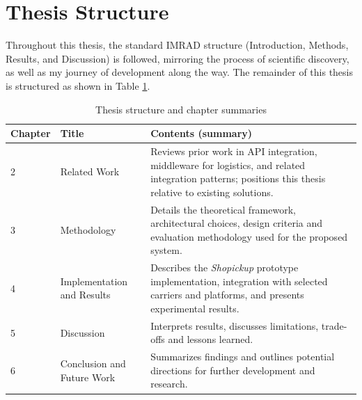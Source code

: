 \documentclass{imc-inf}
\begin{document}
\section{Thesis Structure}
Throughout this thesis, the standard IMRAD structure (Introduction, Methods, Results, and Discussion) is followed, mirroring the process of scientific discovery, as well as my journey of development along the way.
The remainder of this thesis is structured as shown in Table \ref{tab:thesis-structure}.

\begin{table}[!htbp]
  \centering
  \begin{tabular}{@{}p{1.5cm}p{4cm}p{9cm}@{}}
    \toprule
    \textbf{Chapter} & \textbf{Title}             & \textbf{Contents (summary)}                                                                                                                              \\
    \midrule
    2                & Related Work               & Reviews prior work in API integration, middleware for logistics, and related integration patterns; positions this thesis relative to existing solutions. \\
    3                & Methodology                & Details the theoretical framework, architectural choices, design criteria and evaluation methodology used for the proposed system.                       \\
    4                & Implementation and Results & Describes the \textit{Shopickup} prototype implementation, integration with selected carriers and platforms, and presents experimental results.          \\
    5                & Discussion                 & Interprets results, discusses limitations, trade-offs and lessons learned.                                                                               \\
    6                & Conclusion and Future Work & Summarizes findings and outlines potential directions for further development and research.                                                              \\
    \bottomrule
  \end{tabular}
  \caption{Thesis structure and chapter summaries}
  \label{tab:thesis-structure}
\end{table}
\end{document}
